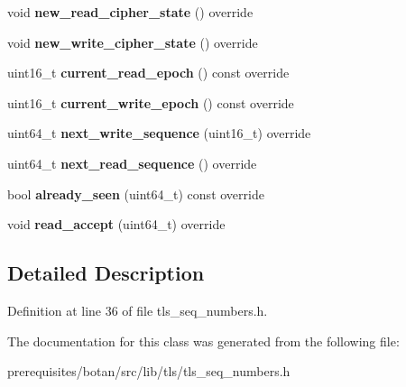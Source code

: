 \begin{DoxyCompactItemize}
\item 
\mbox{\label{class_botan_1_1_t_l_s_1_1_stream___sequence___numbers_a9829b4a248f220b58dffdd8769f4932e}} 
void {\bfseries new\+\_\+read\+\_\+cipher\+\_\+state} () override
\item 
\mbox{\label{class_botan_1_1_t_l_s_1_1_stream___sequence___numbers_adf1e830475c7c44f47c4452146258018}} 
void {\bfseries new\+\_\+write\+\_\+cipher\+\_\+state} () override
\item 
\mbox{\label{class_botan_1_1_t_l_s_1_1_stream___sequence___numbers_ae29b5abfaabfe3778de1818dd5fd31d9}} 
uint16\+\_\+t {\bfseries current\+\_\+read\+\_\+epoch} () const override
\item 
\mbox{\label{class_botan_1_1_t_l_s_1_1_stream___sequence___numbers_af7da25e783def27808d6eaf50f2734e5}} 
uint16\+\_\+t {\bfseries current\+\_\+write\+\_\+epoch} () const override
\item 
\mbox{\label{class_botan_1_1_t_l_s_1_1_stream___sequence___numbers_a53a409e0f9966206163d04be0cbe7aa4}} 
uint64\+\_\+t {\bfseries next\+\_\+write\+\_\+sequence} (uint16\+\_\+t) override
\item 
\mbox{\label{class_botan_1_1_t_l_s_1_1_stream___sequence___numbers_a61e50e1d8c45c7ec40d592b3e8be68b1}} 
uint64\+\_\+t {\bfseries next\+\_\+read\+\_\+sequence} () override
\item 
\mbox{\label{class_botan_1_1_t_l_s_1_1_stream___sequence___numbers_af3a48a5dfcd1f8a6697fbda3df92a955}} 
bool {\bfseries already\+\_\+seen} (uint64\+\_\+t) const override
\item 
\mbox{\label{class_botan_1_1_t_l_s_1_1_stream___sequence___numbers_a73ebae9271bb9b07e7017d38f72e68a9}} 
void {\bfseries read\+\_\+accept} (uint64\+\_\+t) override
\end{DoxyCompactItemize}


\subsection{Detailed Description}


Definition at line 36 of file tls\+\_\+seq\+\_\+numbers.\+h.



The documentation for this class was generated from the following file\+:\begin{DoxyCompactItemize}
\item 
prerequisites/botan/src/lib/tls/tls\+\_\+seq\+\_\+numbers.\+h\end{DoxyCompactItemize}
